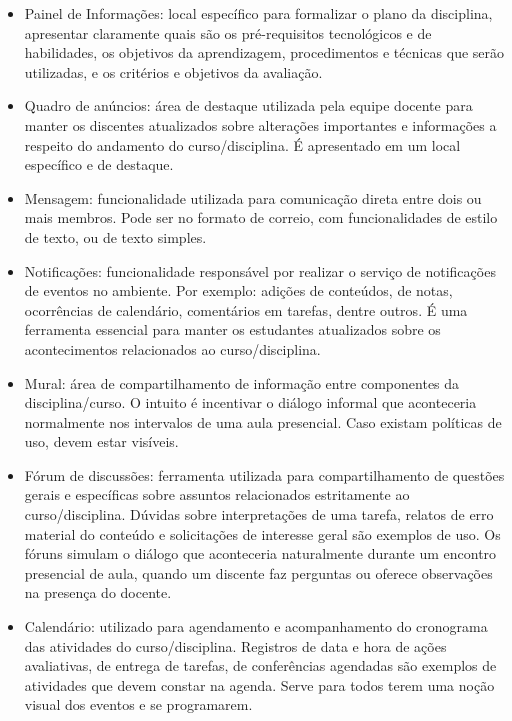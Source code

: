 \begin{itemize}
\item Painel de Informações: local específico para formalizar o plano da disciplina, apresentar claramente quais são os pré-requisitos tecnológicos e de habilidades, os objetivos da aprendizagem, procedimentos e técnicas que serão utilizadas, e os critérios e objetivos da avaliação. 
\item Quadro de anúncios: área de destaque utilizada pela equipe docente para manter os discentes atualizados sobre alterações importantes e informações a respeito do andamento do curso/disciplina. É apresentado em um local específico e de destaque.
\item Mensagem: funcionalidade utilizada para comunicação direta entre dois ou mais membros. Pode ser no formato de correio, com funcionalidades de estilo de texto, ou de texto simples.
\item Notificações: funcionalidade responsável por realizar o serviço de notificações de eventos no ambiente. Por exemplo: adições de conteúdos, de notas, ocorrências de calendário, comentários em tarefas, dentre outros. É uma ferramenta essencial para manter os estudantes atualizados sobre os acontecimentos relacionados ao curso/disciplina.
\item Mural: área de compartilhamento de informação entre componentes da disciplina/curso. O intuito é incentivar o diálogo informal que aconteceria normalmente nos intervalos de uma aula presencial. Caso existam políticas de uso, devem estar visíveis.
\item Fórum de discussões: ferramenta utilizada para compartilhamento de questões gerais e específicas sobre assuntos relacionados estritamente ao curso/disciplina. Dúvidas sobre interpretações de uma tarefa, relatos de erro material do conteúdo e solicitações de interesse geral são exemplos de uso. Os fóruns simulam o diálogo que aconteceria naturalmente durante um encontro presencial de aula, quando um discente faz perguntas ou oferece observações na presença do docente.
\item Calendário: utilizado para agendamento e acompanhamento do cronograma das atividades do curso/disciplina. Registros de data e hora de ações avaliativas, de entrega de tarefas, de conferências agendadas são exemplos de atividades que devem constar na agenda. Serve para todos terem uma noção visual dos eventos e se programarem.

\end{itemize}
